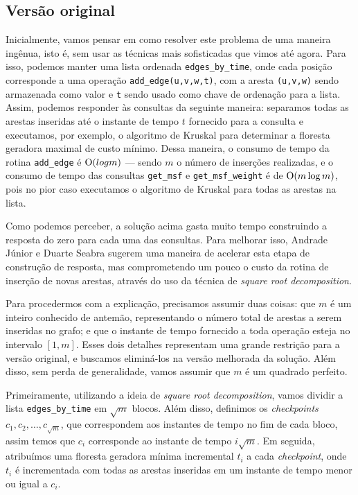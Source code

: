\subsection{Versão original}
\label{sec:rmsf-versao-ori}

Inicialmente, vamos pensar em como resolver este problema de uma maneira ingênua, isto é, sem usar as técnicas mais sofisticadas que vimos até agora. Para isso, podemos manter uma lista ordenada \texttt{edges\_by\_time}, onde cada posição corresponde a uma operação \texttt{add\_edge(u,v,w,t)}, com a aresta \texttt{(u,v,w)} sendo armazenada como valor e \texttt{t} sendo usado como chave de ordenação para a lista. Assim, podemos responder às consultas da seguinte maneira: separamos todas as arestas inseridas até o instante de tempo $t$ fornecido para a consulta e executamos, por exemplo, o algoritmo de Kruskal para determinar a floresta geradora maximal de custo mínimo. Dessa maneira, o consumo de tempo da rotina \texttt{add\_edge} é $\mathrm{O} (log m)$ --- sendo $m$ o número de inserções realizadas, e o consumo de tempo das consultas \texttt{get\_msf} e \texttt{get\_msf\_weight} é de $\mathrm{O}(m \log m)$, pois no pior caso executamos o algoritmo de Kruskal para todas as arestas na lista.

Como podemos perceber, a solução acima gasta muito tempo construindo a resposta do zero para cada uma das consultas. Para melhorar isso, Andrade Júnior e Duarte Seabra sugerem uma maneira de acelerar esta etapa de construção de resposta, mas comprometendo um pouco o custo da rotina de inserção de novas arestas, através do uso da técnica de \emph{square root decomposition}.

Para procedermos com a explicação, precisamos assumir duas coisas: que $m$ é um inteiro conhecido de antemão, representando o número total de arestas a serem inseridas no grafo; e que o instante de tempo fornecido a toda operação esteja no intervalo $[1,m]$. Esses dois detalhes representam uma grande restrição para a versão original, e buscamos eliminá-los na versão melhorada da solução. Além disso, sem perda de generalidade, vamos assumir que $m$ é um quadrado perfeito.

Primeiramente, utilizando a ideia de \emph{square root decomposition}, vamos dividir a lista \texttt{edges\_by\_time} em $\sqrt{m}$ blocos. Além disso, definimos os \emph{checkpoints} $c_1, c_2, \dots, c_{\sqrt{m}}$, que correspondem aos instantes de tempo no fim de cada bloco, assim temos que $c_i$ corresponde ao instante de tempo $i \sqrt{m}$. Em seguida, atribuímos uma floresta geradora mínima incremental $t_i$ a cada \emph{checkpoint}, onde $t_i$ é incrementada com todas as arestas inseridas em um instante de tempo menor ou igual a $c_i$.

